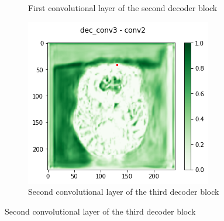\begin{figure}[H]
\begin{subfigure}{.32\textwidth}
        \caption{First convolutional layer of the second decoder block}
    \end{subfigure}\hfill%
    \begin{subfigure}{.32\textwidth}
        \centering
        \includegraphics[width=\linewidth]{chapters/04_segmentation/images/grad_cam_29.png}
        \caption{Second convolutional layer of the third decoder block}
    \end{subfigure}


\end{figure}
